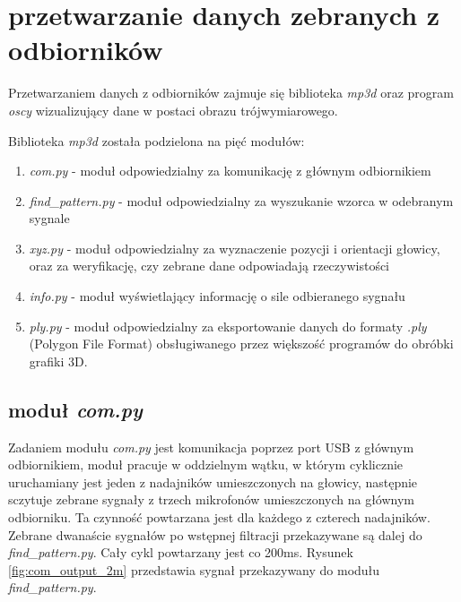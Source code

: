\chapter{przetwarzanie danych zebranych z odbiorników}

Przetwarzaniem danych z odbiorników zajmuje się biblioteka \textit{mp3d}
oraz program \textit{oscy} wizualizujący dane w postaci obrazu trójwymiarowego.

Biblioteka \textit{mp3d} została podzielona na pięć modułów:
\begin{enumerate}

 \item \textit{com.py} - moduł odpowiedzialny za komunikację z głównym odbiornikiem
 \item \textit{find\_pattern.py} - moduł odpowiedzialny za wyszukanie wzorca w odebranym sygnale
 \item \textit{xyz.py} - moduł odpowiedzialny za wyznaczenie pozycji i orientacji głowicy, oraz za 
 weryfikację, czy zebrane dane odpowiadają rzeczywistości
 \item \textit{info.py} - moduł wyświetlający informację o sile odbieranego sygnału
 \item \textit{ply.py} - moduł odpowiedzialny za eksportowanie danych do formaty \textit{.ply} 
    (Polygon File Format) obsługiwanego przez większość programów do obróbki grafiki 3D.

\end{enumerate}


\section{moduł \textit{com.py}}

Zadaniem modułu \textit{com.py} jest komunikacja poprzez port USB z głównym odbiornikiem,
moduł pracuje w oddzielnym wątku, w którym cyklicznie uruchamiany jest jeden z nadajników umieszczonych na głowicy,
następnie sczytuje zebrane sygnały z trzech mikrofonów umieszczonych na głównym odbiorniku.
Ta czynność powtarzana jest dla każdego z czterech nadajników. 
Zebrane dwanaście sygnałów po wstępnej filtracji przekazywane są dalej do \textit{find\_pattern.py}. Cały cykl powtarzany jest
co 200ms. Rysunek \ref{fig:com_output_2m} przedstawia sygnał przekazywany do modułu \textit{find\_pattern.py}.


